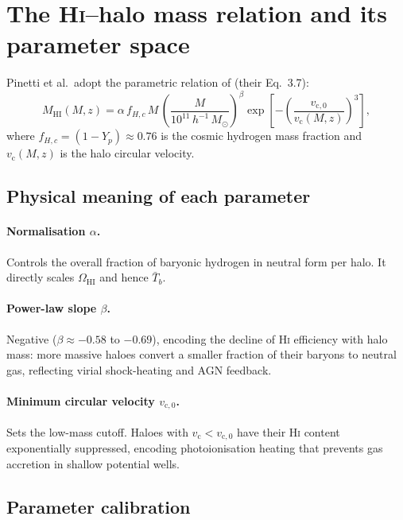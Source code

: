 \documentclass[10pt,a4paper]{article}
\newcommand{\Msun}{M_{\odot}}
\newcommand{\OmHI}{\Omega_{\mathrm{HI}}}
\newcommand{\Tbar}{\bar{T}_b}
\newcommand{\MHI}{M_{\mathrm{HI}}}
\newcommand{\vc}{v_{\mathrm{c}}}
\newcommand{\vczero}{v_{\mathrm{c},0}}
\newcommand{\fHc}{f_{H,c}}
\begin{document}
\section{The H\textsc{i}--halo mass relation and its parameter space}
\label{sec:MHI-M}

Pinetti et al.\ adopt the parametric relation of
\citet{Padmanabhan2017} (their Eq.~3.7):
\begin{equation}
  \label{eq:MHI}
  \boxed{
  \MHI(M, z) = \alpha\,\fHc\,M\,
  \left(\frac{M}{10^{11}\,h^{-1}\,\Msun}\right)^{\!\beta}
  \exp\!\left[-\left(\frac{\vczero}{\vc(M,z)}\right)^{\!3}\right],
  }
\end{equation}
where $\fHc = (1 - Y_p) \approx 0.76$ is the cosmic hydrogen mass fraction
and $\vc(M,z)$ is the halo circular velocity.


\subsection{Physical meaning of each parameter}

\paragraph{Normalisation $\alpha$.}
Controls the overall fraction of baryonic hydrogen in neutral form per halo.
It directly scales $\OmHI$ and hence $\Tbar$.

\paragraph{Power-law slope $\beta$.}
Negative ($\beta \approx -0.58$ to $-0.69$), encoding the decline of
H\textsc{i} efficiency with halo mass: more massive haloes convert a smaller
fraction of their baryons to neutral gas, reflecting virial shock-heating and
AGN feedback.

\paragraph{Minimum circular velocity $\vczero$.}
Sets the low-mass cutoff.  Haloes with $\vc < \vczero$ have their H\textsc{i}
content exponentially suppressed, encoding photoionisation heating that
prevents gas accretion in shallow potential wells.


\subsection{Parameter calibration}
\end{document}
